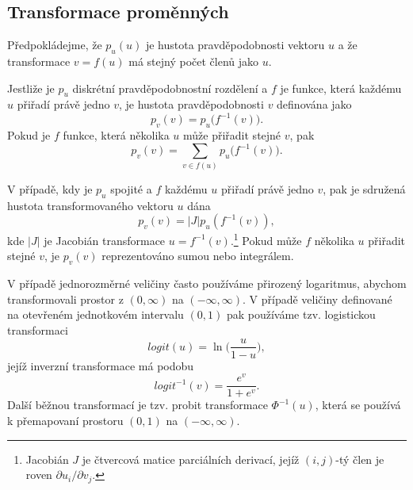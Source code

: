 \subsection{Transformace proměnných}

Předpokládejme, že $p_u(u)$ je hustota pravděpodobnosti vektoru $u$ a že transformace $v = f(u)$ má stejný počet členů jako $u$.

Jestliže je $p_u$ diskrétní pravděpodobnostní rozdělení a $f$ je funkce, která každému $u$ přiřadí právě jedno $v$, je hustota pravděpodobnosti $v$ definována jako
\begin{equation}
p_v(v) = p_u\big(f^{-1}(v)\big).
\end{equation}
Pokud je $f$ funkce, která několika $u$ může přiřadit stejné $v$, pak
\begin{equation}
p_v(v) = \sum_{v \in f(u)} p_u\big(f^{-1}(v)\big).
\end{equation}

V případě, kdy je $p_u$ spojité a $f$ každému $u$ přiřadí právě jedno $v$, pak je sdružená hustota transformovaného vektoru $u$ dána
\begin{equation}
p_v(v) = |J| p_u(f^{-1}(v)),
\end{equation}
kde $|J|$ je Jacobián transformace $u = f^{-1}(v)$.\footnote{Jacobián $J$ je čtvercová matice parciálních derivací, jejíž $(i,j)$-tý člen je roven $\partial u_i / \partial v_j$.} Pokud může $f$ několika $u$ přiřadit stejné $v$, je $p_v(v)$ reprezentováno sumou nebo integrálem.

V případě jednorozměrné veličiny často používáme přirozený logaritmus, abychom transformovali prostor z $(0, \infty)$ na $(-\infty, \infty)$. V případě veličiny definované na otevřeném jednotkovém intervalu $(0, 1)$ pak používáme tzv. logistickou transformaci
\begin{equation}
logit(u) = \ln\Big(\frac{u}{1 - u}\Big),
\end{equation}
jejíž inverzní transformace má podobu
\begin{equation}
logit^{-1}(v) = \frac{e^v}{1 + e^v}.
\end{equation}
Další běžnou transformací je tzv. probit transformace $\Phi^{-1}(u)$, která se používá k přemapovaní prostoru $(0, 1)$ na $(-\infty, \infty)$.
